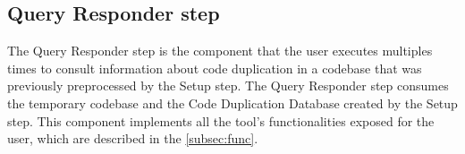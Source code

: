 \subsection{Query Responder step}

The Query Responder step is the component that the user executes multiples times to consult information about code duplication in
a codebase that was previously preprocessed by the Setup step. The Query Responder step consumes the temporary codebase and the 
Code Duplication Database created by the Setup step. This component implements all the tool's functionalities exposed 
for the user, which are described in the \ref{subsec:func}.

